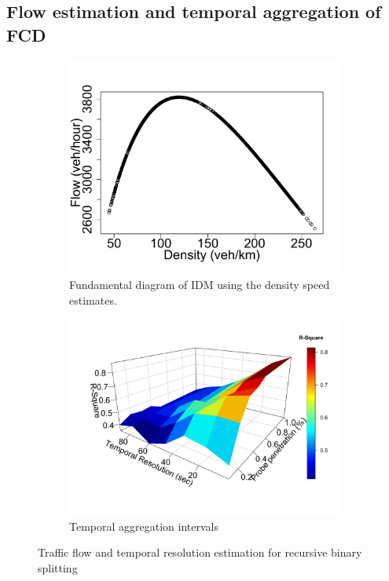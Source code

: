 \documentclass[procedia]{easychair}
\begin{document}
\subsection{Flow estimation and temporal aggregation of FCD}

  \begin{figure}[!htbp]
   \begin{subfigure}{.45\textwidth}
  \centering
           \includegraphics[clip=true,trim=0cm 0cm 0cm 2.0cm,scale=0.27]{graphs/Simulated/flow-vs-density}
       	\caption{Fundamental diagram of IDM using the density speed estimates.}
       	 \label{fig:flow-density}
   \end{subfigure}
   \begin{subfigure}{.5\textwidth}
     \centering
             \includegraphics[clip=true,trim=1.0cm 2.8cm 0.5cm 1.7cm,scale=0.27]{graphs/Simulated/RSquare-sampling-freq-vs-penetration}
         	\caption{Temporal aggregation intervals}
         	 \label{fig:temporal-aggrgeation}
    \end{subfigure} 
   \caption{ Traffic flow and temporal resolution estimation for recursive binary splitting}
   \end{figure}
\end{document}
